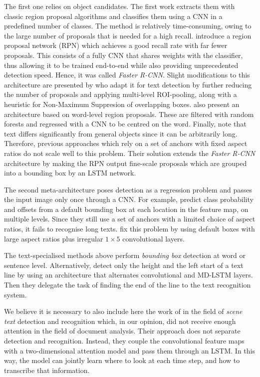 		The first one relies on object candidates. The first work \citep{fast_rcnn} extracts them with classic region proposal algorithms and classifies them using a CNN in a predefined number of classes. The method is relatively time-consuming, owing to the large number of proposals that is needed for a high recall.  introduce a region proposal network (RPN) which achieves a good recall rate with far fewer proposals. This consists of a fully CNN that shares weights with the classifier, thus allowing it to be trained end-to-end while also providing unprecedented detection speed. Hence, it was called \emph{Faster R-CNN}. Slight modifications to this architecture are presented by \citet{deeptext} who adapt it for text detection by further reducing the number of proposals and applying multi-level ROI-pooling, along with a heuristic for Non-Maximum Suppresion of overlapping boxes.  also present an architecture based on word-level region proposals. These are filtered with random forests and regressed with a CNN to be centred on the word. Finally, \citet{ctpn} note that text differs significantly from general objects since it can be arbitrarily long. Therefore, previous approaches which rely on a set of anchors with fixed aspect ratios do not scale well to this problem. Their solution extends the \emph{Faster R-CNN} architecture by making the RPN output fine-scale proposals which are grouped into a bounding box by an LSTM network.

		The second meta-architecture poses detection as a regression problem and passes the input image only once through a CNN. For example, \citet{ssd} predict class probability and offsets from a default bounding box at each location in the feature map, on multiple levels. Since they still use a set of anchors with a limited choice of aspect ratios, it fails to recognise long texts.  fix this problem by using default boxes with large aspect ratios plus irregular $1 \times 5$ convolutional layers.

		The text-specialised methods above perform \emph{bounding box} detection at word or sentence level. Alternatively, \citet{moysset_whereToStart} detect only the height and the left start of a text line by using an architecture that alternates convolutional and MD-LSTM layers. Then they delegate the task of finding the end of the line to the text recognition system.

		We believe it is necessary to also include here the work of \citet{attention_french} in the field of \emph{scene text} detection and recognition which, in our opinion, did not receive enough attention in the field of document analysis. Their approach does not separate detection and recognition. Instead, they couple the convolutional feature maps with a two-dimensional attention model and pass them through an LSTM. In this way, the model can jointly learn where to look at each time step, and how to transcribe that information.




